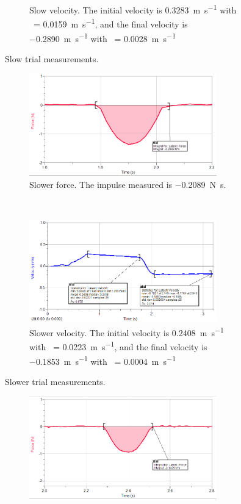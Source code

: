 \documentclass[12pt]{article}
\newcommand{\mps}[1]{\SI{#1}{\meter\per\second}}
\newcommand{\impls}[1]{\SI{#1}{\newton\second}}
\begin{document}
\begin{enumerate}
\begin{figure}[H]
\begin{subfigure}[t]{0.5\textwidth}
                \caption{Slow velocity. The initial velocity is \mps{0.3283} with \textsigma\ = \mps{0.0159}, and the final velocity is \mps{-.2890} with \textsigma\ = \mps{0.0028}}
            \end{subfigure}
            \caption{Slow trial measurements.}
        \end{figure}
        \begin{figure}[H]
            \begin{subfigure}[t]{0.5\textwidth}
                \centering
                \includegraphics[width=3.2in]{slower_force}
                \caption{Slower force. The impulse measured is \impls{-0.2089}.}
            \end{subfigure}%
            ~
            \begin{subfigure}[t]{0.5\textwidth}
                \centering
                \includegraphics[width=3.2in]{slower_velo}
                \caption{Slower velocity. The initial velocity is \mps{0.2408} with \textsigma\ = \mps{0.0223}, and the final velocity is \mps{-.1853} with \textsigma\ = \mps{0.0004}}
            \end{subfigure}
            \caption{Slower trial measurements.}
        \end{figure}
        \begin{figure}[H]
            \begin{subfigure}[t]{0.5\textwidth}
                \centering
                \includegraphics[width=3.2in]{slowest_force}

\end{subfigure}
\end{figure}
\end{enumerate}
\end{document}
